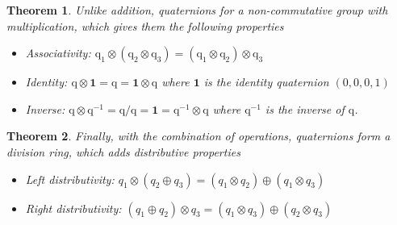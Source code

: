 \documentclass{amsart}
\newtheorem{theorem}{Theorem}[section]
\theoremstyle{definition}
\theoremstyle{remark}
\numberwithin{equation}{section}
\begin{document}
\begin{theorem}
  Unlike addition, quaternions for a \emph{non-commutative} group with multiplication, which gives them the following properties
  \begin{itemize}
  \item Associativity: $\mathrm{q}_1\otimes(\mathrm{q}_2\otimes \mathrm{q}_3) = (\mathrm{q}_1\otimes \mathrm{q}_2) \otimes \mathrm{q}_3$
  \item Identity: $\mathrm{q}\otimes\mathbf{1}=\mathrm{q}=\mathbf{1}\otimes \mathrm{q}$ where $\mathbf{1}$ is the identity quaternion $(0, 0, 0, 1)$
  \item Inverse: $\mathrm{q}\otimes \mathrm{q}^{-1}=\mathrm{q}/\mathrm{q}=\mathbf{1}=\mathrm{q}^{-1}\otimes \mathrm{q}$ where $\mathrm{q}^{-1}$ is the inverse of $\mathrm{q}$.
  \end{itemize}
\end{theorem}

\begin{theorem}
  Finally, with the combination of operations, quaternions form a division ring, which adds distributive properties
  \begin{itemize}
  \item Left distributivity: $q_1 \otimes \left(q_2\oplus q_3\right) = \left(q_1\otimes q_2\right) \oplus \left(q_1\otimes q_3\right)$
    \item Right distributivity: $\left(q_1 \oplus q_2\right) \otimes q_3 = \left(q_1\otimes q_3\right) \oplus \left(q_2 \otimes q_3\right)$
  \end{itemize}
\end{theorem}
\end{document}
